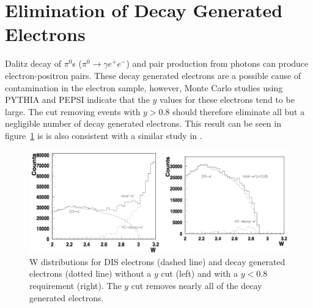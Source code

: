 \section{Elimination of Decay Generated Electrons}
\label{sec:decayGeneratedElectrons}
Dalitz decay of $\pi^0$s ($\pi^0 \rightarrow \gamma e^+ e^-$) and pair production from photons can produce electron-positron pairs.
These decay generated electrons are a possible cause of contamination in the electron sample, however, Monte Carlo studies using PYTHIA and PEPSI indicate that the $y$ values for these electrons tend to be large.
The cut removing events with $y > 0.8$ should therefore eliminate all but a negligible number of decay generated electrons.
This result can be seen in figure~\ref{fig:decayElectronRemoval} is is also consistent with a similar study in \cite{Prok14}.
%
\begin{figure}[htp]
\centering
\includegraphics[width=6in]{figures/decayElectronRemoval.png}
\caption{W distributions for DIS electrons (dashed line) and decay generated electrons (dotted line) without a $y$ cut (left) and with a $y<0.8$ requirement (right). The $y$ cut removes nearly all of the decay generated electrons.}
\label{fig:decayElectronRemoval}
\end{figure}
